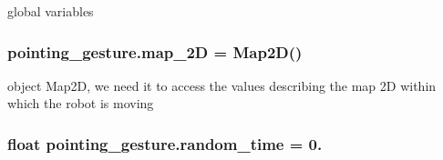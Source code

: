 global variables 

\subsubsection[{\texorpdfstring{map\+\_\+2D}{map_2D}}]{\setlength{\rightskip}{0pt plus 5cm}pointing\+\_\+gesture.\+map\+\_\+2D = {\bf Map2D}()}\hypertarget{namespacepointing__gesture_a08e4083045796d171c79d2538f1b9948}{}\label{namespacepointing__gesture_a08e4083045796d171c79d2538f1b9948}


object Map2D, we need it to access the values describing the map 2D within which the robot is moving 

\subsubsection[{\texorpdfstring{random\+\_\+time}{random_time}}]{\setlength{\rightskip}{0pt plus 5cm}float pointing\+\_\+gesture.\+random\+\_\+time = 0.}\hypertarget{namespacepointing__gesture_a5368d56de06c11e03076a319bb31d276}{}\label{namespacepointing__gesture_a5368d56de06c11e03076a319bb31d276}
